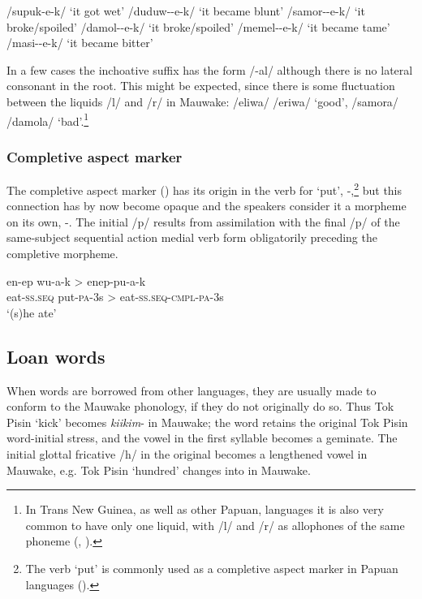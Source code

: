\ea
\ea
/supuk-e-k/  `it got wet'
\ex
/duduw--e-k/  `it became blunt'
\ex
/samor--e-k/  `it broke/spoiled'
\ex
/damol--e-k/  `it broke/spoiled'
\ex
/memel--e-k/  `it became tame'
\ex
/masi--e-k/  `it became bitter'
\z
\z

In a few cases the inchoative suffix has the form /-al/ although there is no lateral consonant in the root.  This might be expected, since there is some fluctuation between the liquids /l/ and /r/ in Mauwake: /eliwa/ {\Tilde} /eriwa/ `good', /samora/ {\Tilde} /damola/ `bad'.\footnote{In Trans New Guinea, as well as other Papuan, languages it is also very common to have only one liquid, with /l/ and /r/ as allophones of the same phoneme (\citealt[55]{Wurm1982}, \citealt[55]{Foley1986}).} 


\subsubsection{Completive aspect marker}\label{sec:2:z:y:x}

The completive aspect marker () has its origin in the verb for `put', \nobreakdash-,\footnote{The verb `put' is commonly used as a completive aspect marker in Papuan languages ().} but this connection has by now become opaque and the speakers consider it a morpheme on its own, -.  The initial /p/ results from assimilation with the final /p/ of the same-subject sequential action medial verb form obligatorily preceding the completive morpheme.

\ea
\gll en-ep  wu-a-k  {\upshape \textgreater}  enep-pu-a-k \\ 
eat-\textsc{ss}.\textsc{seq}  put-\textsc{pa}-3s  {{\textgreater}}  eat-\textsc{ss}.\textsc{seq}-\textsc{cmpl}-\textsc{pa}-3s\\
\glt `(s)he ate'
\z

\subsection{Loan words}\label{sec:2:y:x}

When words are borrowed from other languages, they are usually made to conform to the Mauwake phonology, if they do not originally do so.  Thus Tok Pisin  `kick' becomes \textit{kiikim}- in Mauwake; the word retains the original Tok Pisin word-initial stress, and the vowel in the first syllable becomes a geminate.  The initial glottal fricative /h/ in the original becomes a lengthened vowel in Mauwake, e.g. Tok Pisin  `hundred' changes into   in Mauwake.

